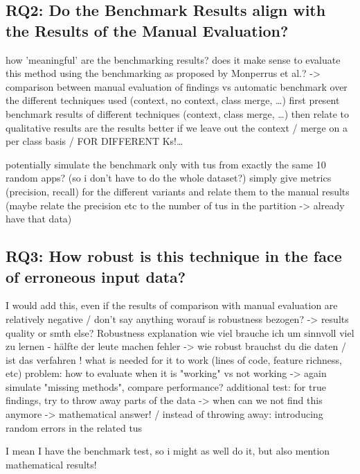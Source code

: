 \subsection{RQ2: Do the Benchmark Results align with the Results of the Manual Evaluation?}

how 'meaningful' are the benchmarking results?
does it make sense to evaluate this method using the benchmarking as proposed by Monperrus et al.?
-> comparison between manual evaluation of findings vs automatic benchmark over the different techniques used (context, no context, class merge, \ldots)
first present benchmark results of different techniques (context, class merge, \ldots) then relate to qualitative results
are the results better if we leave out the context / merge on a per class basis / FOR DIFFERENT Ks!\ldots


potentially simulate the benchmark only with tus from exactly the same 10 random apps? (so i don't have to do the whole dataset?)
simply give metrics (precision, recall) for the different variants and relate them to the manual results
(maybe relate the precision etc to the number of tus in the partition -> already have that data)

\subsection{RQ3: How robust is this technique in the face of erroneous input data?}

I would add this, even if the results of comparison with manual evaluation are relatively negative / don't say anything
worauf is robustness bezogen? -> results quality or smth else?
Robustness explanation
    wie viel brauche ich um sinnvoll viel zu lernen - hälfte der leute machen fehler -> wie robust brauchst du die daten / ist das verfahren !
    what is needed for it to work (lines of code, feature richness, etc) 
    problem: how to evaluate when it is "working" vs not working -> again simulate "missing methods", compare performance?
additional test:
	for true findings, try to throw away parts of the data -> when can we not find this anymore -> mathematical answer!
    / instead of throwing away: introducing random errors in the related tus


I mean I have the benchmark test, so i might as well do it, but also mention mathematical results!

